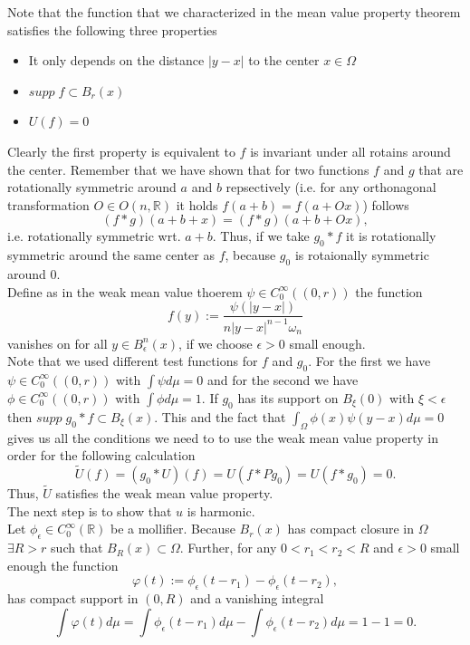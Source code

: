 \documentclass[A4,12pt,twoside]{book}
\begin{document}
{Note that the function that we characterized in the mean value property theorem satisfies the following three properties
\begin{itemize}
    \item [1.] It only depends on the distance $|y-x|$ to the center $x \in \Omega$
    \item  [2.] $supp \; f \subset B_r (x)$
    \item [3.] $U(f)=0$
 \end{itemize}
 Clearly the first property is equivalent to $f$ is invariant under all rotains around the center. Remember that we have shown that for two functions $f$ and $g$ that are rotationally symmetric around $a$ and $b$ repsectively (i.e. for any orthonagonal transformation $O \in O(n,\mathbb{R})$ it holds $f(a+b)=f(a+Ox)$) follows 
 \[
 (f * g) (a+b+x) = (f*g) (a+b+Ox),
 \]
 i.e. rotationally symmetric wrt. $a+b$. Thus, if we take $g_0 * f$ it is rotationally symmetric around the same center as $f$, because $g_0$ is rotaionally symmetric around $0$.\\
 Define as in the weak mean value thoerem $\psi \in C_0^\infty ((0,r))$ the function
 \[
 f(y) := \frac{\psi (|y-x|)}{n |y-x|^{n-1} \omega_n}
 \]
 vanishes on for all $y \in B_\epsilon^n (x)$, if we choose $\epsilon>0$ small enough. \\
 Note that we used different test functions for $f$ and $g_0$. For the first we have $\psi \in C_0^\infty ((0,r))$ with $\int \psi d\mu=0$ and for the second we have $\phi \in C_0^\infty ((0,r))$ with $\int \phi d \mu =1$. If $g_0$ has its support on $B_\xi (0)$ with $\xi < \epsilon$ then $supp  \;g_0*f\subset B_\xi (x)$. This and the fact that $\int_\Omega \phi (x) \psi (y-x) d\mu =0$ gives us all the conditions we need to to use the weak mean value property in order for the following calculation
 \[
 \tilde{U} (f) = (g_0 * U) (f) = U (f*Pg_0) = U(f* g_0) =0.
 \]
 Thus, $\tilde{U}$ satisfies the weak mean value property.\\
 The next step is to show that $u$ is harmonic.\\
 Let $\phi_\epsilon \in C_0^\infty (\mathbb{R})$ be a mollifier. Because $B_r (x)$ has compact closure in $\Omega$ $\exists R>r$ such that $B_R (x) \subset \Omega$. Further, for any $0<r_1<r_2 < R$ and $\epsilon>0$ small enough the function
 \[ 
 \varphi (t) := \phi_\epsilon (t-r_1) - \phi_\epsilon (t-r_2),
 \]
 has compact support in $(0,R)$ and a vanishing integral
 \[
 \int \varphi(t) d \mu = \int \phi_\epsilon (t-r_1) d \mu - \int \phi_\epsilon (t-r_2) d \mu  =1-1=0.
\]}
\end{document}
